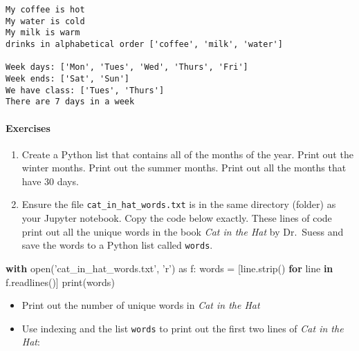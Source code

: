 \documentclass[11pt]{article}
\providecommand{\tightlist}{%
      \setlength{\itemsep}{0pt}\setlength{\parskip}{0pt}}
\newenvironment{Shaded}{}{}
\newcommand{\KeywordTok}[1]{\textcolor[rgb]{0.00,0.44,0.13}{\textbf{{#1}}}}
\newcommand{\StringTok}[1]{\textcolor[rgb]{0.25,0.44,0.63}{{#1}}}
\newcommand{\NormalTok}[1]{{#1}}
\newcommand{\ImportTok}[1]{{#1}}
\newcommand{\ControlFlowTok}[1]{\textcolor[rgb]{0.00,0.44,0.13}{\textbf{{#1}}}}
\newcommand{\OperatorTok}[1]{\textcolor[rgb]{0.40,0.40,0.40}{{#1}}}
\newcommand{\BuiltInTok}[1]{{#1}}
\begin{document}
    \begin{Verbatim}[commandchars=\\\{\}]
My coffee is hot
My water is cold
My milk is warm
drinks in alphabetical order ['coffee', 'milk', 'water']

Week days: ['Mon', 'Tues', 'Wed', 'Thurs', 'Fri']
Week ends: ['Sat', 'Sun']
We have class: ['Tues', 'Thurs']
There are 7 days in a week

    \end{Verbatim}

    \hypertarget{exercises}{%
\paragraph{Exercises}\label{exercises}}

\begin{enumerate}
\def\labelenumi{\arabic{enumi}.}
\tightlist
\item
  Create a Python list that contains all of the months of the year.
  Print out the winter months. Print out the summer months. Print out
  all the months that have 30 days.
\item
  Ensure the file \texttt{cat\_in\_hat\_words.txt} is in the same
  directory (folder) as your Jupyter notebook. Copy the code below
  exactly. These lines of code print out all the unique words in the
  book \emph{Cat in the Hat} by Dr.~Suess and save the words to a Python
  list called \texttt{words}.
\end{enumerate}

\begin{Shaded}
\begin{Highlighting}[]
\ControlFlowTok{with} \BuiltInTok{open}\NormalTok{(}\StringTok{'cat_in_hat_words.txt'}\NormalTok{, }\StringTok{'r'}\NormalTok{) }\ImportTok{as}\NormalTok{ f:}
\NormalTok{    words }\OperatorTok{=}\NormalTok{ [line.strip() }\ControlFlowTok{for}\NormalTok{ line }\KeywordTok{in}\NormalTok{ f.readlines()]}
\BuiltInTok{print}\NormalTok{(words)}
\end{Highlighting}
\end{Shaded}

\begin{itemize}
\tightlist
\item
  Print out the number of unique words in \emph{Cat in the Hat}
\item
  Use indexing and the list \texttt{words} to print out the first two
  lines of \emph{Cat in the Hat}:
\end{itemize}
\end{document}
